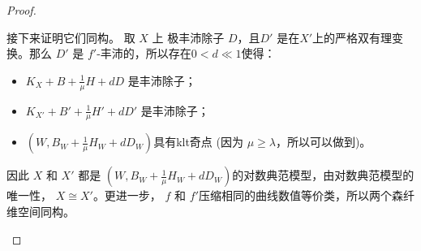 \begin{proof}
\begin{enumerate}
接下来证明它们同构。 取 $X$ 上  极丰沛除子 $ D $，且$D'  $ 是在$ X' $上的严格双有理变换。那么  $ D' $ 是 $ f' $-丰沛的，所以存在$ 0<d\ll1 $使得：
          \begin{itemize}
            \item $ K_X+B+\frac{1}{\mu }H+dD $ 是丰沛除子；
            \item $ K_{X'}+B'+\frac{1}{\mu }H'+dD' $ 是丰沛除子；
            \item $(W,B_{W}+\frac{1}{\mu}H_{W}+dD_{W})$具有klt奇点 (因为 $\mu \geqslant \lambda$，所以可以做到)。
          \end{itemize}
          因此 $X$ 和 $X'$ 都是 $(W,B_{W}+\frac{1}{\mu}H_{W}+dD_{W})$的对数典范模型，由对数典范模型的唯一性， $X\cong X'$。更进一步， $f$ 和  $f'$压缩相同的曲线数值等价类，所以两个森纤维空间同构。
  \end{enumerate}
\end{proof}

